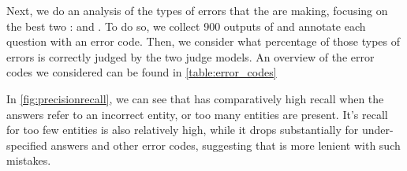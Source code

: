 Next, we do an analysis of the types of errors that the \judgemodels are making, focusing on the best two \judgemodels:  and .
To do so, we collect 900 outputs of  and annotate each question with an error code.
Then, we consider what percentage of those types of errors is correctly judged by the two judge models.
An overview of the error codes we considered can be found in \cref{table:error_codes}

In \cref{fig:precisionrecall}, we can see that  has comparatively high recall when the answers refer to an incorrect entity, or too many entities are present.
It's recall for too few entities is also relatively high, while it drops substantially for under-specified answers and other error codes, suggesting that  is more lenient with such mistakes.

% 


